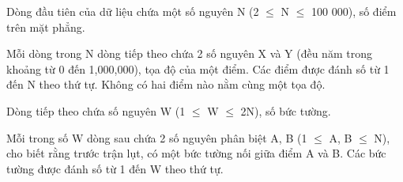 Dòng đầu tiên của dữ liệu chứa một số nguyên N (2  $\le$  N  $\le$  100 000), số điểm trên mặt phẳng.  

   Mỗi dòng trong N dòng tiếp theo chứa 2 số nguyên X và Y (đều năm trong khoảng từ 0 đến 1,000,000), tọa độ của một điểm. Các điểm được đánh số từ 1 đến N theo thứ tự. Không có hai điểm nào nằm cùng một tọa độ.  

   Dòng tiếp theo chứa số nguyên W (1  $\le$  W  $\le$  2N), số bức tường.  

   Mỗi trong số W dòng sau chứa 2 số nguyên phân biệt A, B (1  $\le$  A, B  $\le$  N), cho biết rằng trước trận lụt, có một bức tường nối giữa điểm A và B. Các bức tường được đánh số từ 1 đến W theo thứ tự.